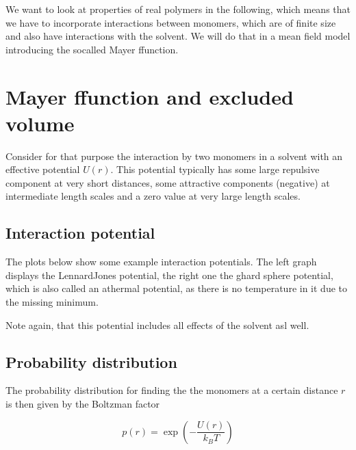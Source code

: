 \documentclass[letterpaper,10pt,english]{sphinxmanual}
\let\sphinxpxdimen\pdfpxdimen\else\newdimen\sphinxpxdimen
\begin{document}
\sphinxAtStartPar
We want to look at properties of real polymers in the following, which means that we have to incorporate interactions between monomers, which are of finite size and also have interactions with the solvent. We will do that in a mean field model introducing the so\sphinxhyphen{}called Mayer f\sphinxhyphen{}function.


\section{Mayer f\sphinxhyphen{}function and excluded volume}
\label{\detokenize{notebooks/L22/1_real_polymers:Mayer-f-function-and-excluded-volume}}
\sphinxAtStartPar
Consider for that purpose the interaction by two monomers in a solvent with an effective potential \(U(r)\). This potential typically has some large repulsive component at very short distances, some attractive components (negative) at intermediate length scales and a zero value at very large length scales.

\noindent\sphinxincludegraphics[width=441\sphinxpxdimen,height=293\sphinxpxdimen]{{interaction}.png}


\subsection{Interaction potential}
\label{\detokenize{notebooks/L22/1_real_polymers:Interaction-potential}}
\sphinxAtStartPar
The plots below show some example interaction potentials. The left graph displays the Lennard\sphinxhyphen{}Jones potential, the right one the ghard sphere potential, which is also called an athermal potential, as there is no temperature in it due to the missing minimum.

\sphinxAtStartPar
Note again, that this potential includes all effects of the solvent asl well.

\noindent{}


\subsection{Probability distribution}
\label{\detokenize{notebooks/L22/1_real_polymers:Probability-distribution}}
\sphinxAtStartPar
The probability distribution for finding the the monomers at a certain distance \(r\) is then given by the Boltzman factor

\sphinxAtStartPar
\begin{equation}
p(r)=\exp\left (-\frac{U(r)}{k_B T}\right)
\end{equation}
\end{document}
